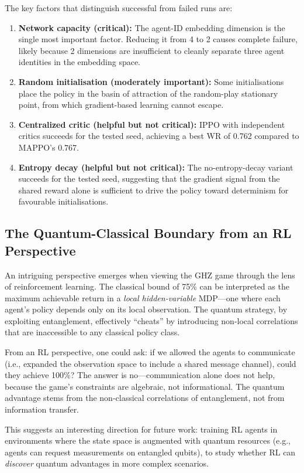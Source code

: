 \documentclass[conference]{IEEEtran}
\begin{document}
The key factors that distinguish successful from failed runs are:

\begin{enumerate}
    \item \textbf{Network capacity (critical):} The agent-ID embedding dimension is the single most important factor. Reducing it from 4 to 2 causes complete failure, likely because 2 dimensions are insufficient to cleanly separate three agent identities in the embedding space.
    \item \textbf{Random initialisation (moderately important):} Some initialisations place the policy in the basin of attraction of the random-play stationary point, from which gradient-based learning cannot escape.
    \item \textbf{Centralized critic (helpful but not critical):} IPPO with independent critics succeeds for the tested seed, achieving a best WR of 0.762 compared to MAPPO's 0.767.
    \item \textbf{Entropy decay (helpful but not critical):} The no-entropy-decay variant succeeds for the tested seed, suggesting that the gradient signal from the shared reward alone is sufficient to drive the policy toward determinism for favourable initialisations.
\end{enumerate}

\subsection{The Quantum-Classical Boundary from an RL Perspective}

An intriguing perspective emerges when viewing the GHZ game through the lens of reinforcement learning. The classical bound of 75\% can be interpreted as the maximum achievable return in a \emph{local hidden-variable} MDP---one where each agent's policy depends only on its local observation. The quantum strategy, by exploiting entanglement, effectively ``cheats'' by introducing non-local correlations that are inaccessible to any classical policy class.

From an RL perspective, one could ask: if we allowed the agents to communicate (i.e., expanded the observation space to include a shared message channel), could they achieve 100\%? The answer is no---communication alone does not help, because the game's constraints are algebraic, not informational. The quantum advantage stems from the non-classical correlations of entanglement, not from information transfer.

This suggests an interesting direction for future work: training RL agents in environments where the state space is augmented with quantum resources (e.g., agents can request measurements on entangled qubits), to study whether RL can \emph{discover} quantum advantages in more complex scenarios.
\end{document}
